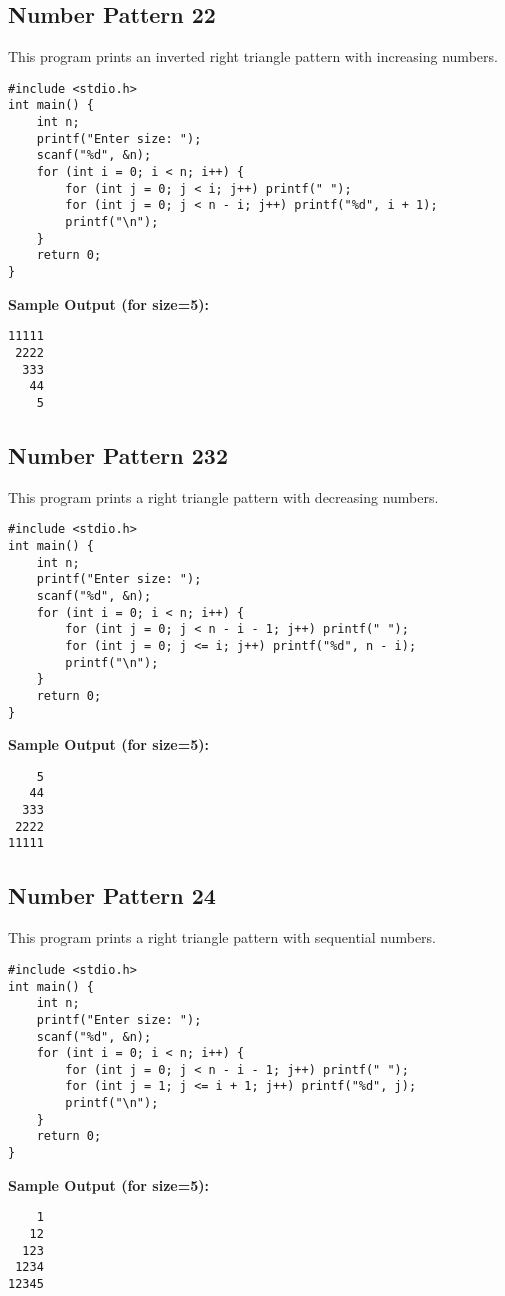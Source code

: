 \documentclass[a4paper,12pt]{article}
\begin{document}
\subsection{Number Pattern 22}
This program prints an inverted right triangle pattern with increasing numbers.
\begin{lstlisting}[caption={Number Pattern 22}]
#include <stdio.h>
int main() {
    int n;
    printf("Enter size: ");
    scanf("%d", &n);
    for (int i = 0; i < n; i++) {
        for (int j = 0; j < i; j++) printf(" ");
        for (int j = 0; j < n - i; j++) printf("%d", i + 1);
        printf("\n");
    }
    return 0;
}
\end{lstlisting}
\textbf{Sample Output (for size=5):}
\begin{verbatim}
11111
 2222
  333
   44
    5
\end{verbatim}
\clearpage

\subsection{Number Pattern 232}
This program prints a right triangle pattern with decreasing numbers.
\begin{lstlisting}[caption={Number Pattern 23}]
#include <stdio.h>
int main() {
    int n;
    printf("Enter size: ");
    scanf("%d", &n);
    for (int i = 0; i < n; i++) {
        for (int j = 0; j < n - i - 1; j++) printf(" ");
        for (int j = 0; j <= i; j++) printf("%d", n - i);
        printf("\n");
    }
    return 0;
}
\end{lstlisting}
\textbf{Sample Output (for size=5):}
\begin{verbatim}
    5
   44
  333
 2222
11111
\end{verbatim}
\clearpage

\subsection{Number Pattern 24}
This program prints a right triangle pattern with sequential numbers.
\begin{lstlisting}[caption={Number Pattern 24}]
#include <stdio.h>
int main() {
    int n;
    printf("Enter size: ");
    scanf("%d", &n);
    for (int i = 0; i < n; i++) {
        for (int j = 0; j < n - i - 1; j++) printf(" ");
        for (int j = 1; j <= i + 1; j++) printf("%d", j);
        printf("\n");
    }
    return 0;
}
\end{lstlisting}
\textbf{Sample Output (for size=5):}
\begin{verbatim}
    1
   12
  123
 1234
12345
\end{verbatim}
\clearpage
\end{document}
